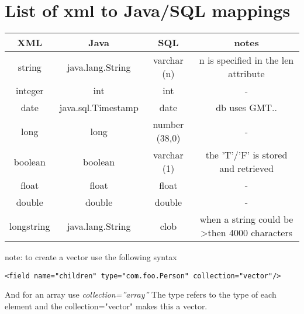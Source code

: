 \section{List of xml to Java/SQL mappings}


\begin{tabular}{|c|c|c|c|}
\hline
XML & Java & SQL & notes \\ \hline \hline
string & java.lang.String & varchar (n) & n is specified in the len
attribute \\ \hline

integer & int & int & - \\ \hline

date & java.sql.Timestamp & date & db uses GMT.. \\ \hline

long & long & number (38,0) & - \\ \hline

boolean & boolean & varchar (1) & the 'T'/'F' is stored and retrieved \\

float & float & float & - \\ \hline

double & double & double & - \\ \hline

longstring & java.lang.String & clob & when a string could be \textgreater then 4000 characters \\ \hline

\hline
\end{tabular}

note: to create a vector use the following syntax

\begin{verbatim}
<field name="children" type="com.foo.Person" collection="vector"/>
\end{verbatim}
And for an array use \textit{collection=''array''}
The type refers to the type of each element and the
collection="vector" makes this a vector.

